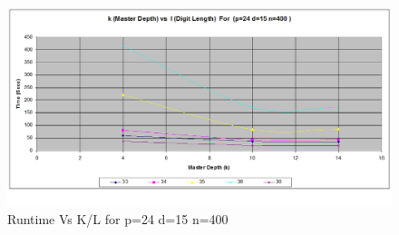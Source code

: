 \documentclass[twoside,11pt]{article}\usepackage{amsmath,amsfonts,amsthm,fullpage}
\begin{document}
\begin{figure}[!htbp]
\centering
\includegraphics[scale=.46]{images/pdn_p=24-d=15-n=400} 
\caption{Runtime Vs K/L for p=24 d=15 n=400}
\label{Runtime Vs K/L for p=24 d=15 n=400}
\end{figure}



\pagebreak
\end{document}

